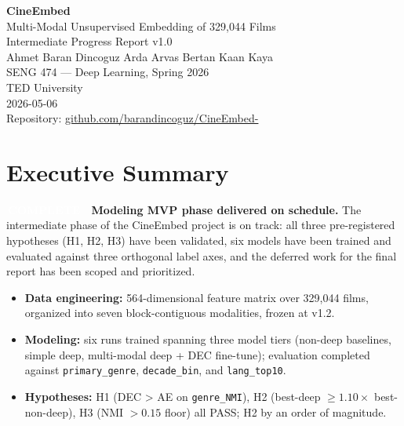 \documentclass[11pt,a4paper]{article}
\newcommand{\status}[1]{%
  \ifstrequal{#1}{complete}{\colorbox{brandAccent}{\textcolor{white}{\sffamily\bfseries\small\,COMPLETE\,}}}{%
  \ifstrequal{#1}{inprogress}{\colorbox{brandAmber}{\textcolor{white}{\sffamily\bfseries\small\,IN PROGRESS\,}}}{%
  \ifstrequal{#1}{planned}{\colorbox{brandSecondary}{\textcolor{white}{\sffamily\bfseries\small\,PLANNED\,}}}{%
  \ifstrequal{#1}{deferred}{\colorbox{brandSlate}{\textcolor{white}{\sffamily\bfseries\small\,DEFERRED\,}}}{}}}}%
}
\begin{document}
\thispagestyle{empty}
\vspace*{4cm}
\begin{center}
{\sffamily\Huge\bfseries\color{brandPrimary} CineEmbed} \\[0.4cm]
{\sffamily\Large Multi-Modal Unsupervised Embedding of 329{,}044 Films} \\[1.6cm]
{\sffamily\large\color{brandSecondary} Intermediate Progress Report \textbullet{} v1.0} \\[2.5cm]
{\large Ahmet Baran Dincoguz \quad\textbullet\quad Arda Arvas \quad\textbullet\quad Bertan Kaan Kaya} \\[1.0cm]
{\sffamily\normalsize SENG 474 --- Deep Learning, Spring 2026} \\
{\sffamily\normalsize TED University} \\[0.6cm]
{\sffamily\normalsize 2026-05-06} \\[1.5cm]
{\small\color{brandSlate}Repository: \href{https://github.com/barandincoguz/CineEmbed-}{github.com/barandincoguz/CineEmbed-}}
\end{center}
\vfill
\clearpage

\section*{Executive Summary}

\noindent\status{complete}\ \textbf{Modeling MVP phase delivered on schedule.} The intermediate phase of the CineEmbed project is on track: all three pre-registered hypotheses (H1, H2, H3) have been validated, six models have been trained and evaluated against three orthogonal label axes, and the deferred work for the final report has been scoped and prioritized.

\begin{itemize}[leftmargin=1.2em, itemsep=2pt, topsep=2pt]
  \item \textbf{Data engineering:} 564-dimensional feature matrix over 329{,}044 films, organized into seven block-contiguous modalities, frozen at v1.2.
  \item \textbf{Modeling:} six runs trained spanning three model tiers (non-deep baselines, simple deep, multi-modal deep + DEC fine-tune); evaluation completed against \texttt{primary\_genre}, \texttt{decade\_bin}, and \texttt{lang\_top10}.
  \item \textbf{Hypotheses:} H1 (DEC > AE on \texttt{genre\_NMI}), H2 (best-deep $\geq 1.10\times$ best-non-deep), H3 (NMI $> 0.15$ floor) all PASS; H2 by an order of magnitude.
\end{itemize}
\end{document}
